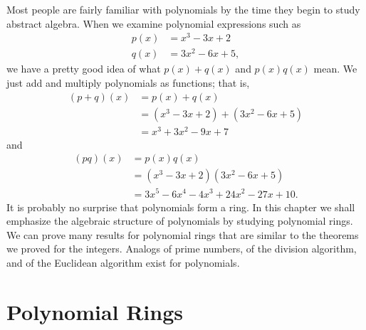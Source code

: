  
Most people are fairly familiar with polynomials by the time they begin to study abstract algebra.  When we examine polynomial expressions such as 
\begin{align*} 
p(x) & = x^3 -3x +2 \\
q(x) & = 3x^2 -6x +5,
\end{align*}
we have a pretty good idea of what $p(x) + q(x)$ and $p(x) q(x)$ mean.  We just add and multiply polynomials as functions; that is, 
\begin{align*}
(p +q)(x) & = p(x) + q(x) \\
& =  ( x^3 - 3 x + 2 ) + ( 3 x^2 - 6 x + 5 ) \\
& = x^3 + 3 x^2 - 9 x + 7
\end{align*}
and
\begin{align*}
(p q)(x) & = p(x)  q(x) \\
& =  ( x^3 - 3 x + 2 )  ( 3 x^2 - 6 x + 5 ) \\
& = 3 x^5 - 6 x^4 - 4 x^3 + 24 x^2 - 27 x + 10.
\end{align*}
It is probably no surprise that polynomials form a ring.  In this chapter we shall emphasize the algebraic structure of polynomials by studying polynomial rings.  We can prove many results for polynomial rings that are similar to the theorems we proved for the integers.  Analogs of prime numbers, of the division algorithm, and of the Euclidean algorithm exist for polynomials.   

 
\section{Polynomial Rings}\label{poly_section_1}
 
